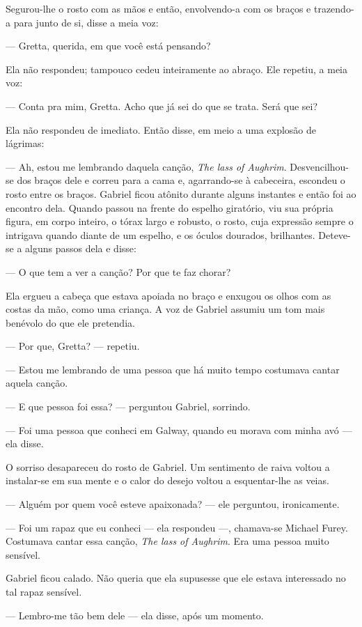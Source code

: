 Segurou-lhe o rosto com as mãos e então, envolvendo-a com os braços e
trazendo-a para junto de si, disse a meia voz:

--- Gretta, querida, em que você está pensando?

Ela não respondeu; tampouco cedeu inteiramente ao abraço. Ele
repetiu, a meia voz:

--- Conta pra mim, Gretta. Acho que já sei do que se trata. Será que
sei?

Ela não respondeu de imediato. Então disse, em meio a uma explosão de
lágrimas:

--- Ah, estou me lembrando daquela canção, \textit{The lass of Aughrim}.
Desvencilhou-se dos braços dele e correu para a cama e, agarrando-se
à cabeceira, escondeu o rosto entre os braços. Gabriel ficou atônito
durante alguns instantes e então foi ao encontro dela. Quando passou
na frente do espelho giratório, viu sua própria figura, em corpo
inteiro, o tórax largo e robusto, o rosto, cuja expressão sempre o
intrigava quando diante de um espelho, e os óculos dourados,
brilhantes. Deteve-se a alguns passos dela e disse:

--- O que tem a ver a canção? Por que te faz chorar?

Ela ergueu a cabeça que estava apoiada no braço e enxugou os olhos com
as costas da mão, como uma criança. A voz de Gabriel assumiu um tom
mais benévolo do que ele pretendia.

--- Por que, Gretta? --- repetiu.

--- Estou me lembrando de uma pessoa que há muito tempo costumava
cantar aquela canção.

--- E que pessoa foi essa? --- perguntou Gabriel, sorrindo.

--- Foi uma pessoa que conheci em Galway, quando eu morava com minha
avó --- ela disse.

O sorriso desapareceu do rosto de Gabriel. Um sentimento de raiva
voltou a instalar-se em sua mente e o calor do desejo voltou a
esquentar-lhe as veias.

--- Alguém por quem você esteve apaixonada? --- ele perguntou,
ironicamente.

--- Foi um rapaz que eu conheci --- ela respondeu ---, chamava-se
Michael Furey. Costumava cantar essa canção, \textit{The lass of Aughrim}. Era
uma pessoa muito sensível.

Gabriel ficou calado. Não queria que ela supusesse que ele estava
interessado no tal rapaz sensível.

--- Lembro-me tão bem dele --- ela disse, após um momento.

